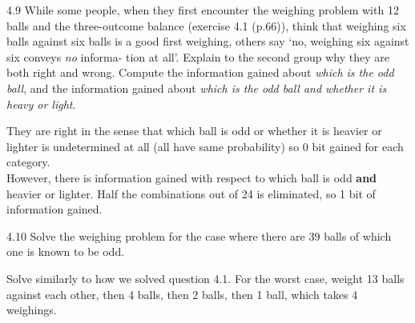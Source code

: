 \documentclass[12pt, a4paper]{article}
\begin{document}
\begin{prob}{4.9}
    While some people, when they first encounter the weighing
problem with 12 balls and the three-outcome balance (exercise 4.1
(p.66)), think that weighing six balls against six balls is a good first
weighing, others say `no, weighing six against six conveys \textit{no} informa-
tion at all'. Explain to the second group why they are both right and
wrong. Compute the information gained about \textit{which is the odd ball},
and the information gained about \textit{which is the odd ball and whether it is
heavy or light}.
\end{prob}
\begin{sol}
    They are right in the sense that which ball is odd or whether it is heavier or lighter is undetermined at all (all have same probability) so 0 bit gained for each category. \\
    However, there is information gained with respect to which ball is odd \textbf{and} heavier or lighter. Half the combinations out of 24 is eliminated, so 1 bit of information gained.
\end{sol}
\bigskip


\begin{prob}{4.10}
    Solve the weighing problem for the case where there are 39
balls of which one is known to be odd.
\end{prob}
\begin{sol}
    Solve similarly to how we solved question 4.1. For the worst case, weight 13 balls against each other, then 4 balls, then 2 balls, then 1 ball, which takes 4 weighings.
\end{sol}
\bigskip
\end{document}
